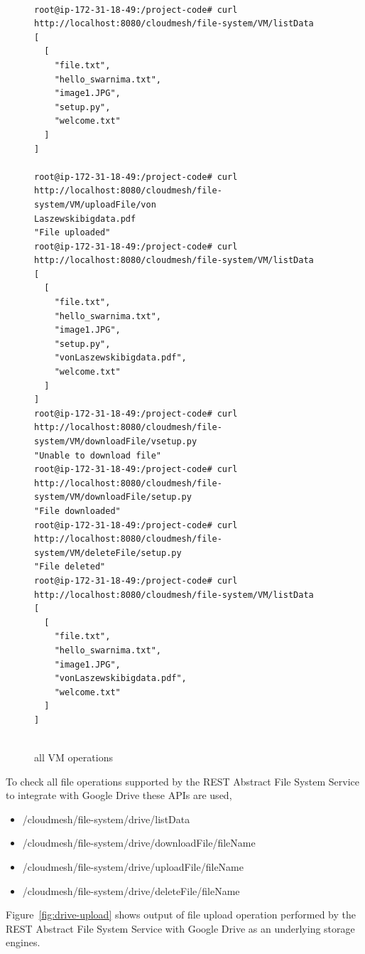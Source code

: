 \begin{figure}[!ht]
\begin{footnotesize}
\begin{verbatim}

root@ip-172-31-18-49:/project-code# curl 
http://localhost:8080/cloudmesh/file-system/VM/listData
[
  [
    "file.txt",
    "hello_swarnima.txt",
    "image1.JPG",
    "setup.py",
    "welcome.txt"
  ]
]

root@ip-172-31-18-49:/project-code# curl 
http://localhost:8080/cloudmesh/file-system/VM/uploadFile/von
Laszewskibigdata.pdf
"File uploaded"
root@ip-172-31-18-49:/project-code# curl 
http://localhost:8080/cloudmesh/file-system/VM/listData                    
[
  [
    "file.txt",
    "hello_swarnima.txt",
    "image1.JPG",
    "setup.py",
    "vonLaszewskibigdata.pdf",
    "welcome.txt"
  ]
]
root@ip-172-31-18-49:/project-code# curl 
http://localhost:8080/cloudmesh/file-system/VM/downloadFile/vsetup.py
"Unable to download file"
root@ip-172-31-18-49:/project-code# curl 
http://localhost:8080/cloudmesh/file-system/VM/downloadFile/setup.py
"File downloaded"
root@ip-172-31-18-49:/project-code# curl 
http://localhost:8080/cloudmesh/file-system/VM/deleteFile/setup.py
"File deleted"
root@ip-172-31-18-49:/project-code# curl 
http://localhost:8080/cloudmesh/file-system/VM/listData
[
  [
    "file.txt",
    "hello_swarnima.txt",
    "image1.JPG",
    "vonLaszewskibigdata.pdf",
    "welcome.txt"
  ]
]


\end{verbatim}
\end{footnotesize}
\caption{all VM operations}\label{fig:VM}
\end{figure}


To check all file operations supported by the REST Abstract File
System Service to integrate with Google Drive these APIs are used,

\begin{itemize}

    \item /cloudmesh/file-system/drive/listData
    \item /cloudmesh/file-system/drive/downloadFile/{fileName}
    \item /cloudmesh/file-system/drive/uploadFile/{fileName}
    \item /cloudmesh/file-system/drive/deleteFile/{fileName}

\end{itemize}

Figure~\ref{fig:drive-upload} shows output of file upload operation
performed by the REST Abstract File System Service with Google Drive
as an underlying storage engines.


